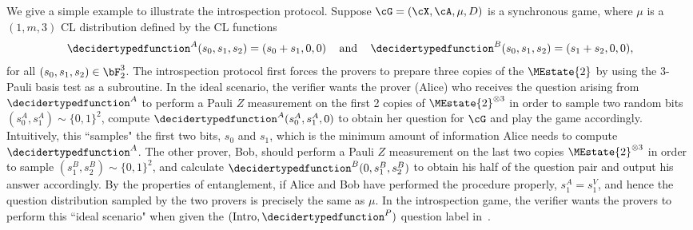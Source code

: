 We give a simple example to illustrate the introspection protocol. Suppose $\cG = (\cX, \cA, \mu, D)$ is a synchronous game, where $\mu$ is a $(1, m, 3)$ CL distribution defined by the CL functions
\begin{equation}\label{eq:introexample}
	\decidertypedfunction^{A}(s_0, s_1, s_2) = (s_0+ s_1,0,0) \, \quad \text{and} \quad \, 	\decidertypedfunction^{B}(s_0, s_1, s_2)  = (s_1 + s_2, 0,0), 
\end{equation}
for all $(s_0, s_1, s_2) \in \bF_2^3$. The introspection protocol first forces the provers to prepare three copies of the $\MEstate{2}$ by using the $3$-Pauli basis test as a subroutine. In the ideal scenario, the verifier wants the prover (Alice) who receives the question arising from $\decidertypedfunction^{A}$ to perform a Pauli $Z$ measurement on the first 2 copies of $\MEstate{2}^{\otimes 3}$ in order to sample two random bits $(s_0^A, s_1^A) \sim \{0,1\}^2$, compute $\decidertypedfunction^{A}(s_0^A, s_1^A,0)$ to obtain her question for $\cG$ and play the game accordingly. Intuitively, this ``samples" the first two bits, $s_0$ and $s_1$, which is the minimum amount of information Alice needs to compute $\decidertypedfunction^{A}$. The other prover, Bob, should perform a Pauli $Z$ measurement on the last two copies $\MEstate{2}^{\otimes 3}$ in order to sample $(s_1^B, s_2^B) \sim \{0,1\}^2$, and calculate $\decidertypedfunction^{B}(0, s_1^B, s_2^B)$ to obtain his half of the question pair and output his answer accordingly. By the properties of entanglement, if Alice and Bob have performed the procedure properly, $s_1^A = s_1^V$, and hence the question distribution sampled by the two provers is precisely the same as $\mu$. In the introspection game, the verifier wants the provers to perform this ``ideal scenario" when given the $(\text{Intro}, \decidertypedfunction^{P})$ question label in~.

